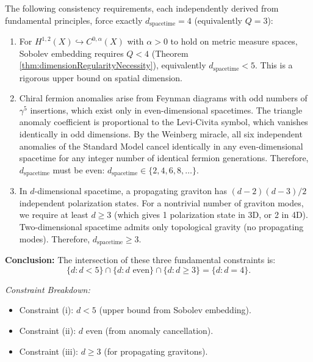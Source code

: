 

\begin{lemma}
\label{lem:dimensionUnicityFourConstraints}

The following consistency requirements, each independently derived from fundamental principles, force exactly $d_{\mathrm{spacetime}} = 4$ (equivalently $Q = 3$):

\begin{enumerate}
\item[\textbf{(i) Eigenfunction Regularity (Metric Emergence):}] For $H^{1,2}(X) \hookrightarrow C^{0,\alpha}(X)$ with $\alpha > 0$ to hold on metric measure spaces, Sobolev embedding requires $Q < 4$ (Theorem \ref{thm:dimensionRegularityNecessity}), equivalently $d_{\mathrm{spacetime}} < 5$. This is a rigorous upper bound on spatial dimension.

\item[\textbf{(ii) Anomaly-Free Even Dimension Requirement:}] Chiral fermion anomalies arise from Feynman diagrams with odd numbers of $\gamma^5$ insertions, which exist only in even-dimensional spacetimes. The triangle anomaly coefficient is proportional to the Levi-Civita symbol, which vanishes identically in odd dimensions. By the Weinberg miracle, all six independent anomalies of the Standard Model cancel identically in any even-dimensional spacetime for any integer number of identical fermion generations. Therefore, $d_{\mathrm{spacetime}}$ must be even: $d_{\mathrm{spacetime}} \in \{2, 4, 6, 8, \ldots\}$.

\item[\textbf{(iii) Graviton Propagation (General):}] In $d$-dimensional spacetime, a propagating graviton has $(d-2)(d-3)/2$ independent polarization states. For a nontrivial number of graviton modes, we require at least $d \geq 3$ (which gives 1 polarization state in 3D, or 2 in 4D). Two-dimensional spacetime admits only topological gravity (no propagating modes). Therefore, $d_{\mathrm{spacetime}} \geq 3$.
\end{enumerate}

\textbf{Conclusion:} The intersection of these three fundamental constraints is:
\begin{equation}
\{d : d < 5\} \cap \{d : d \text{ even}\} \cap \{d : d \geq 3\} = \{d : d = 4\}.
\end{equation}

\textit{Constraint Breakdown:}
\begin{itemize}
\item Constraint (i): $d < 5$ (upper bound from Sobolev embedding).
\item Constraint (ii): $d$ even (from anomaly cancellation).
\item Constraint (iii): $d \geq 3$ (for propagating gravitons).
\end{itemize}


\end{lemma}
